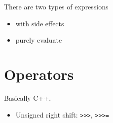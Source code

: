 \documentclass[../main.tex]{subfiles}
\begin{document}
There are two types of expressions
\begin{itemize}
	\item with side effects
	\item purely evaluate
\end{itemize}

\section{Operators}
Basically C++.
\begin{itemize}
	\item Unsigned right shift: \verb|>>>|, \verb|>>>=|
\end{itemize}
\end{document}
